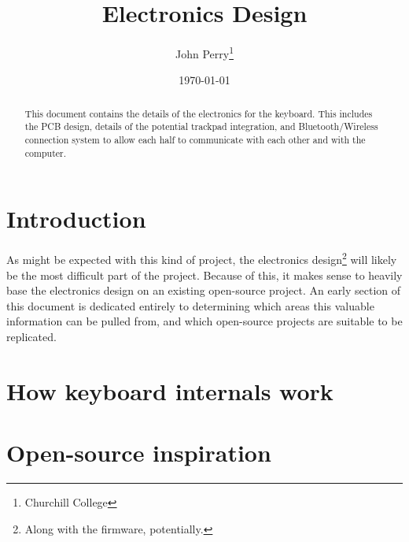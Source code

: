 \documentclass[11pt,a4paper]{article}
\title{Electronics Design}
\author{John Perry\thanks{Churchill College}}
\date{\today}
\numberwithin{equation}{section}
\begin{document}
\pagestyle{empty}

\maketitle

\pagestyle{fancy}

\begin{abstract}
    This document contains the details of the electronics for the keyboard. This includes the PCB design, details of the potential trackpad integration, and Bluetooth/Wireless connection system to allow each half to communicate with each other and with the computer.
\end{abstract}

\section{Introduction}

As might be expected with this kind of project, the electronics design\footnote{Along with the firmware, potentially.} will likely be the most difficult part of the project. Because of this, it makes sense to heavily base the electronics design on an existing open-source project. An early section of this document is dedicated entirely to determining which areas this valuable information can be pulled from, and which open-source projects are suitable to be replicated.

\section{How keyboard internals work}

\section{Open-source inspiration}
\end{document}
